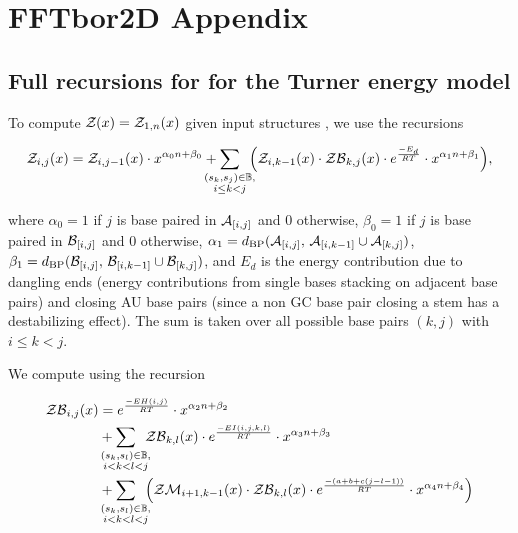 
\chapter{FFTbor2D Appendix}
\label{ch:ffttwoapp}


\section{Full recursions for \texorpdfstring{}{}
for the Turner energy model}
\label{sec:ffttwo:turner}

To compute ${\mathcal Z}_{}(x) = {\mathcal Z}_{1,n}(x)$ given input structures \strAB,
we use the recursions

\begin{align}
\label{eq:ffttwoapp:zx}
\emZ{i,j} = \emZ{i,j-1} \cdot x^{\ab{0}} +
\sum_{\mathclap{\substack{(s_k,s_j) \in \bpSet, \\ i \leq k < j}}}\enspace
\Big( \emZ{i,k-1} \cdot \emZB{k,j} \cdot \boltzE{E_d} \cdot
x^{\ab{1}} \Big),
\end{align}

where
$\alpha_0 = 1$ if $j$ is base paired in $\mathcal A_{[i,j]}$ and $0$ otherwise,
$\beta_0 = 1$ if $j$ is base paired in $\mathcal B_{[i,j]}$ and $0$ otherwise,
$\alpha_1 = d_{\text{BP}}(\mathcal A_{[i,j]},\,\mathcal A_{[i,k-1]} \cup \mathcal A_{[k,j]})$,
$\beta_1 = d_{\text{BP}}(\mathcal B_{[i,j]},\,\mathcal B_{[i,k-1]} \cup \mathcal B_{[k,j]})$,
and $E_d$ is the energy contribution due to dangling ends (energy
contributions from single bases stacking on adjacent base pairs) and
closing AU base pairs (since a non GC base pair closing a stem has a
destabilizing effect).  The sum is taken over all possible
base pairs $(k,j)$ with $i \leq k < j$.

We compute \emZB{} using the recursion

\begin{align}
\label{eq:ffttwoapp:zbx}
\begin{split}
\emZB{i,j} &= \boltzE{EH(i,j)} \cdot x^{\ab{2}} \\
&+ \sum_{\mathclap{\substack{(s_k,s_l) \in \bpSet, \\ i < k < l < j }}}\enspace
\emZB{k,l} \cdot \boltzE{EI(i,j,k,l)} \cdot x^{\ab{3}} \\
&+ \sum_{\mathclap{\substack{(s_k,s_l) \in \bpSet, \\ i < k < l < j }}}\enspace
\Big( \emZM{i+1,k-1} \cdot \emZB{k,l} \cdot \boltzE{(a+b+c(j-l-1))}
\cdot x^{\ab{4}} \Big)
\end{split}
\end{align}

